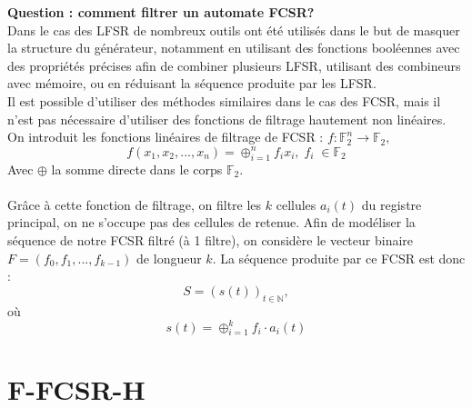 \documentclass[11pt]{report}
\begin{document}
\textbf{Question : comment filtrer un automate FCSR?}\\
Dans le cas des LFSR de nombreux outils ont été utilisés dans le but de masquer la structure du générateur, notamment en utilisant des fonctions booléennes avec des propriétés précises afin de combiner plusieurs LFSR, utilisant des combineurs avec mémoire, ou en réduisant la séquence produite par les LFSR.\\
Il est possible d'utiliser des méthodes similaires dans le cas des FCSR, mais il n'est pas nécessaire d'utiliser des fonctions de filtrage hautement non linéaires. 
\\
On introduit les fonctions linéaires de filtrage de FCSR : 
$
f: \mathbb{F}_2^n \rightarrow \mathbb{F}_2,
$
$$
f(x_1,x_2,...,x_n) = \oplus_{i=1}^n f_ix_i, \; f_i \; \in \mathbb{F}_2
$$
Avec $\oplus$ la somme directe dans le corps $\mathbb{F}_2$.
\\\\
Grâce à cette fonction de filtrage, on filtre les $k$ cellules $a_i(t)$ du registre principal, on ne s'occupe pas des cellules de retenue. Afin de modéliser la séquence de notre FCSR filtré (à 1 filtre), on considère le vecteur binaire $F=(f_0,f_1,...,f_{k-1})$ de longueur $k$. La séquence produite par ce FCSR est donc :
$$
S=(s(t))_{t \in \mathbb{N}},
$$
où
$$
s(t) = \oplus_{i=1}^k f_i \cdot a_i(t)
$$

\section{F-FCSR-H}
\end{document}
